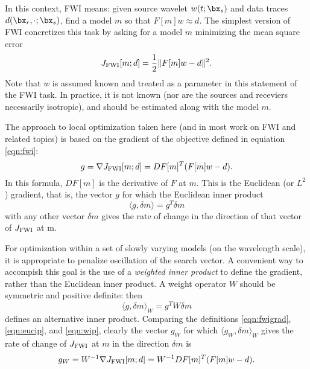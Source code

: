 In this context, FWI means: given source wavelet
$w(t;\bx_s)$ and data traces $d(\bx_r,\cdot;\bx_s)$, find a model $m$
so that $F[m]w \approx d$. The
simplest version of FWI concretizes this task by asking for a model
$m$ minimizing the mean square error
\begin{equation}
  \label{eqn:fwi}
  J_{\rm FWI}[m;d]= \frac{1}{2}\|F[m]w-d\|^2.
\end{equation}
Note that $w$ is assumed known and treated as a parameter in this
statement of the FWI task. In practice, it is not known (nor are the
sources and receviers necessarily isotropic), and should be estimated
along with the model $m$.

The approach to local optimization taken here (and in most work on FWI
and related topics) is based on the gradient of the objective defined
in equiation \ref{eqn:fwi}:
\begin{equation}
  \label{eqn:fwigrad}
  g = \nabla  J_{\rm FWI}[m;d] = DF[m]^T(F[m]w-d).
\end{equation}
In this formula, $DF[m]$ is the derivative of $F$ at $m$. 
This is the Euclidean (or $L^2$) gradient, that is, the vector $g$ for
which the Euclidean inner product
\begin{equation}
  \label{eqn:eucip}
  \langle g, \delta m\rangle = g^T\delta m
\end{equation}
with any other vector $\delta m$ gives the
rate of change in the direction of that vector of $J_{\rm FWI}$ at m.

For optimization within a set of slowly varying models (on the
wavelength scale),  it is appropriate to penalize oscillation of the
search vector. A convenient way to accompish this goal is the use of a
{\em weighted inner product} to define the gradient, rather than the
Euclidean inner product. A weight operator $W$ should be symmetric and
positive definite: then
\begin{equation}
  \label{eqn:wip}
  \langle g, \delta m\rangle_W = g^TW\delta m
\end{equation}
defines an alternative inner product. Comparing the definitions
\ref{eqn:fwigrad}, \ref{eqn:eucip}, and \ref{eqn:wip}, clearly the
vector $g_W$ for which $\langle g_W, \delta m \rangle_W$ gives the
rate of change of $J_{\rm FWI}$ at $m$ in the direction $\delta m$ is
\begin{equation}
  \label{eqn:fwiwgrad}
  g_W = W^{-1}\nabla  J_{\rm FWI}[m;d] =W^{-1} DF[m]^T(F[m]w-d).
\end{equation}

